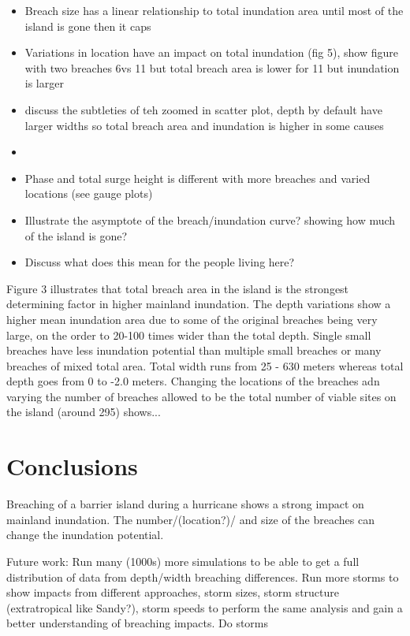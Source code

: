 \documentclass{coastal_paper}
\begin{document}
\begin{itemize}
    \item Breach size has a linear relationship to total inundation area until most of the island is gone then it caps
    \item Variations in location have an impact on total inundation (fig 5), show figure with two breaches 6vs 11 but total breach area is lower for 11 but inundation is larger
    \item discuss the subtleties of teh zoomed in scatter plot, depth by default have larger widths so total breach area and inundation is higher in some causes
    \item 
    \item Phase and total surge height is different with more breaches and varied locations (see gauge plots)
    \item Illustrate the asymptote of the breach/inundation curve? showing how much of the island is gone?
    \item Discuss what does this mean for the people living here?
\end{itemize}

Figure 3 illustrates that total breach area in the island is the strongest determining factor in higher mainland inundation. The depth variations show a higher mean inundation area due to some of the original breaches being very large, on the order to 20-100 times wider than the total depth. Single small breaches have less inundation potential than multiple small breaches or many breaches of mixed total area. Total width runs from 25 - 630 meters whereas total depth goes from 0 to -2.0 meters. 
Changing the locations of the breaches adn varying the number of breaches allowed to be the total number of viable sites on the island (around 295) shows...%

\section{Conclusions}
Breaching of a barrier island during a hurricane shows a strong impact on mainland inundation. The number/(location?)/ and size of the breaches can change the inundation potential.

Future work: Run many (1000s) more simulations to be able to get a full distribution of data from depth/width breaching differences. Run more storms to show impacts from different approaches, storm sizes, storm structure (extratropical like Sandy?), storm speeds to perform the same analysis and gain a better understanding of breaching impacts. Do storms


\end{document}
